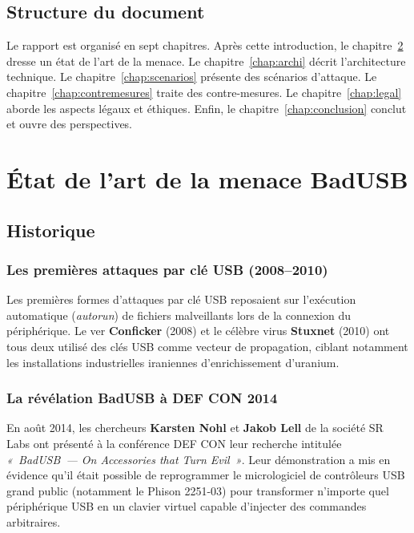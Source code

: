 \documentclass[12pt,a4paper]{report}
\begin{document}
\section{Structure du document}

Le rapport est organisé en sept chapitres. Après cette introduction, le chapitre~\ref{chap:etatart} dresse un état de l'art de la menace. Le chapitre~\ref{chap:archi} décrit l'architecture technique. Le chapitre~\ref{chap:scenarios} présente des scénarios d'attaque. Le chapitre~\ref{chap:contremesures} traite des contre-mesures. Le chapitre~\ref{chap:legal} aborde les aspects légaux et éthiques. Enfin, le chapitre~\ref{chap:conclusion} conclut et ouvre des perspectives.

\chapter{État de l'art de la menace BadUSB}
\label{chap:etatart}

\section{Historique}

\subsection{Les premières attaques par clé USB (2008--2010)}

Les premières formes d'attaques par clé USB reposaient sur l'exécution automatique (\textit{autorun}) de fichiers malveillants lors de la connexion du périphérique. Le ver \textbf{Conficker} (2008) et le célèbre virus \textbf{Stuxnet} (2010) ont tous deux utilisé des clés USB comme vecteur de propagation, ciblant notamment les installations industrielles iraniennes d'enrichissement d'uranium.

\subsection{La révélation BadUSB à DEF CON 2014}

En août 2014, les chercheurs \textbf{Karsten Nohl} et \textbf{Jakob Lell} de la société SR Labs ont présenté à la conférence DEF CON leur recherche intitulée \textit{«~BadUSB~— On Accessories that Turn Evil~»}. Leur démonstration a mis en évidence qu'il était possible de reprogrammer le micrologiciel de contrôleurs USB grand public (notamment le Phison 2251-03) pour transformer n'importe quel périphérique USB en un clavier virtuel capable d'injecter des commandes arbitraires.
\end{document}
